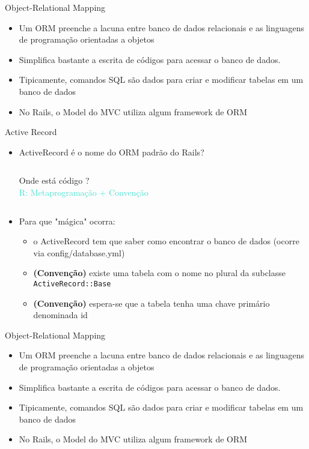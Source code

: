 \begin{frame}{Object-Relational Mapping}
	\begin{itemize}
		\item Um ORM \alert{preenche a lacuna} entre banco de dados relacionais e as linguagens de programação
			orientadas a objetos
		\item \alert{Simplifica} bastante a escrita de códigos para acessar o banco de dados.
		\item Tipicamente, comandos SQL são dados para criar e modificar tabelas em um
		banco de dados
		\item No Rails, o Model do MVC utiliza algum framework de ORM
	\end{itemize}	
\end{frame}

\begin{frame}{Active Record}
	\begin{itemize}
		\item ActiveRecord é o nome do \alert{ORM padrão} do Rails?
		\vspace{15pt}
		\begin{columns}[t]
			
			\alert{\Large Onde está código ?}
			\\
			\textcolor{Turquoise}{\Large R: Metaprogramação + Convenção}
		\end{columns}
		
		\item Para que \alert{"mágica"} ocorra:
		\begin{itemize}
			\item o ActiveRecord tem que saber como encontrar o banco de dados (ocorre via \alert{config/database.yml})
			\item \textbf{(Convenção)} existe uma \alert{tabela} com o \alert{nome no plural} da subclasse \verb|ActiveRecord::Base|
			\item \textbf{(Convenção)} espera-se que a tabela tenha uma chave primário denominada \alert{id}
		\end{itemize}
	\end{itemize}
\end{frame}

\begin{frame}{Object-Relational Mapping}
	\begin{itemize}
		\item Um ORM \alert{preenche a lacuna} entre banco de dados relacionais e as linguagens de programação
		orientadas a objetos
		\item \alert{Simplifica} bastante a escrita de códigos para acessar o banco de dados.
		\item Tipicamente, comandos SQL são dados para criar e modificar tabelas em um
		banco de dados
		\item No Rails, o Model do MVC utiliza algum framework de ORM
	\end{itemize}	
\end{frame}

